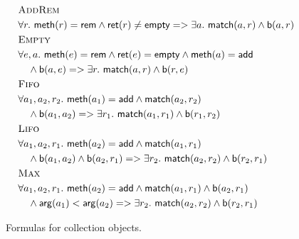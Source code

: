 \begin{figure}
  \footnotesize
  \begin{align*}
    & \textsc{AddRem} \\
    & \forall r.\ {\sf meth}(r) = {\sf rem} \land {\sf ret}(r) \neq {\sf empty} =>
      \exists a.\ {\sf match}(a,r) \land {\sf b}(a,r)
    \\
    & \textsc{Empty} \\
    & \forall e, a.\ {\sf meth}(e) = {\sf rem} \land {\sf ret}(e) = {\sf empty} \land {\sf meth}(a) = {\sf add} \\
    & \quad \land {\sf b}(a,e) => \exists r.\ {\sf match}(a,r) \land {\sf b}(r,e)
    \\
    & \textsc{Fifo} \\
    & \forall a_1, a_2, r_2.\ {\sf meth}(a_1) = {\sf add} \land {\sf match}(a_2,r_2) \\
    & \quad \land {\sf b}(a_1,a_2) =>\exists r_1.\ {\sf match}(a_1,r_1) \land {\sf b}(r_1,r_2)
    \\
    & \textsc{Lifo} \\
    & \forall a_1, a_2, r_1.\ {\sf meth}(a_2) = {\sf add} \land {\sf match}(a_1,r_1) \\
    & \quad \land {\sf b}(a_1,a_2) \land {\sf b}(a_2,r_1) => \exists r_2.\ {\sf match}(a_2,r_2) \land {\sf b}(r_2,r_1)
    \\
    & \textsc{Max} \\
    & \forall a_1, a_2, r_1.\ {\sf meth}(a_2) = {\sf add} \land {\sf match}(a_1,r_1) \land {\sf b}(a_2,r_1) \\
    & \quad \land {\sf arg}(a_1) < {\sf arg}(a_2) => \exists r_2.\ {\sf match}(a_2,r_2) \land {\sf b}(r_2,r_1)
  \end{align*}
  \caption{Formulas for collection objects.}
  \label{fig:formulas:collecions}
\end{figure}


